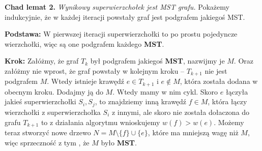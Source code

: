 \documentclass[12pt,a4paper]{article}
\begin{document}
\vskip 0.5cm
\noindent
\textbf{Chad lemat 2.} \emph{Wynikowy superwierzchołek jest MST grafu.} Pokażemy indukcyjnie, że w każdej iteracji powstały graf jest podgrafem jakiegoś MST.

\textbf{Podstawa:} W pierwszej iteracji superwierzchołki to po prostu pojedyncze wierzchołki, więc są one podgrafem każdego \textbf{MST}.

\textbf{Krok:} Załóżmy, że graf \(T_k\) był podgrafem jakiegoś \textbf{MST}, nazwijmy je \(M\). Oraz załóżmy nie wprost, że graf powstały w kolejnym kroku -- \(T_{k+1}\) nie jest podgrafem \(M\). Wtedy istnieje krawędź \(e \in T_{k+1}\) i \(e \notin M\), która została dodana w obecnym kroku. Dodajmy ją do \(M\). Wtedy mamy w nim cykl. Skoro \(e\) łączyła jakieś superwierzchołki \(S_i, S_j\), to znajdziemy inną krawędź \(f\in M\), która łączy wierzchołki z superwierzchołka \(S_i\) z innymi, ale skoro nie została dołaczona do grafu \(T_{k+1}\) to z działania algorytmu wnioskujemy \(w(f) > w(e)\). Możemy teraz stworzyć nowe drzewo \(N = M \setminus \{f\} \cup \{e\}\), które ma mniejszą wagę niż \(M\), więc sprzeczność z tym , że \(M\) było \textbf{MST}.
\end{document}
